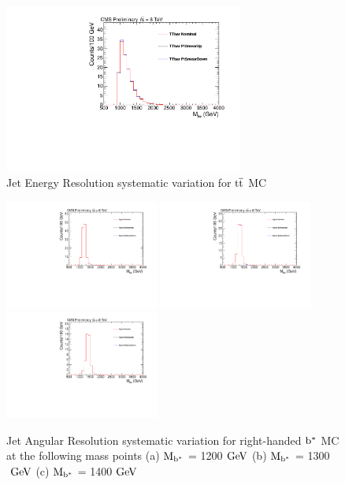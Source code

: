 \begin{figure}[htcb]
\begin{center}
\includegraphics[width=0.7\textwidth]{AN-14-049/figs/TTbar_PtSmearing}
\caption{Jet Energy Resolution systematic variation for $\mathrm{t\overline{t}}$ MC}
\label{figs:bsttbarJER}
\end{center}
\end{figure}

\begin{figure}[htcb]
\begin{center}
\includegraphics[width=0.45\textwidth]{AN-14-049/figs/Signal_M1200_EtaScaling}
\includegraphics[width=0.45\textwidth]{AN-14-049/figs/Signal_M1300_EtaScaling}
\includegraphics[width=0.45\textwidth]{AN-14-049/figs/Signal_M1400_EtaScaling}
\caption{
Jet Angular Resolution systematic variation for right-handed $\mathrm{b}^{*}$  MC at the following mass points
(a) $\mathrm{M_{\mathrm{b}^{*}}}$ = 1200$~\mathrm{GeV}$ 
(b) $\mathrm{M_{\mathrm{b}^{*}}}$ = 1300$~\mathrm{GeV}$
(c) $\mathrm{M_{\mathrm{b}^{*}}}$ = 1400$~\mathrm{GeV}$ 
}
\label{figs:bssignalJAR}
\end{center}
\end{figure}

